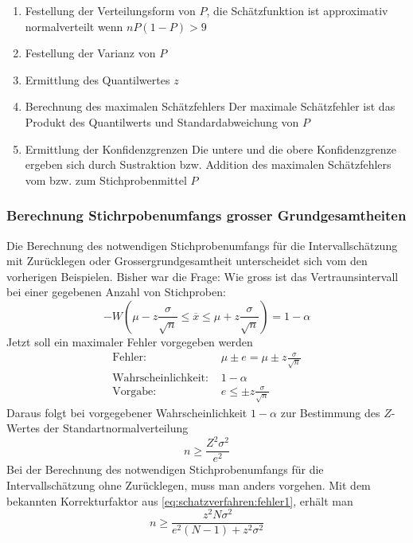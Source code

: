 \begin{enumerate}
\item Festellung der Verteilungsform von $P$, die Schätzfunktion ist approximativ normalverteilt wenn $n P(1-P)>9$
\item Festellung der Varianz von $P$
\item Ermittlung des Quantilwertes $z$
\item Berechnung des maximalen Schätzfehlers
\subitem Der maximale Schätzfehler ist das Produkt des Quantilwerts und Standardabweichung von $P$
\item Ermittlung der Konfidenzgrenzen
\subitem Die untere und die obere Konfidenzgrenze ergeben sich durch Sustraktion bzw. Addition des maximalen Schätzfehlers vom bzw. zum Stichprobenmittel $P$
\end{enumerate}
\subsubsection{Berechnung Stichrpobenumfangs grosser Grundgesamtheiten}
Die Berechnung des notwendigen Stichprobenumfangs für die Intervallschätzung mit Zurücklegen oder Grossergrundgesamtheit unterscheidet sich vom den vorherigen Beispielen. Bisher war die Frage: Wie gross ist das Vertraunsintervall bei einer gegebenen Anzahl von Stichproben:
\begin{equation}\label{eq:stichprobenumfang:1}
-W\left(\mu - z \frac{\sigma}{\sqrt{n}}\leq \overline{x}\leq \mu + z \frac{\sigma}{\sqrt{n}}\right)=1-\alpha
\end{equation}
Jetzt soll ein maximaler Fehler vorgegeben werden
\begin{align}
\text{Fehler: }&\mu\pm e = \mu \pm z\frac{\sigma}{\sqrt{n}}\label{eq:schatzverfahren:fehler1} \\ 
\text{Wahrscheinlichkeit: }&1-\alpha\\
\text{Vorgabe: }&e\leq\pm z\frac{\sigma}{\sqrt{n}}
\end{align}
Daraus folgt bei vorgegebener Wahrscheinlichkeit $1-\alpha$ zur Bestimmung des $Z$-Wertes der Standartnormalverteilung
\begin{equation}
n \geq \frac{Z^2\sigma^2}{e^2}
\end{equation}
Bei der Berechnung des notwendigen Stichprobenumfangs für die Intervallschätzung ohne Zurücklegen, muss man anders vorgehen. Mit dem bekannten Korrekturfaktor aus \autoref{eq:schatzverfahren:fehler1}, erhält man
\begin{equation}\label{eq:schätzverfahren:2}
n \geq \frac{z^2 N \sigma^2}{e^2(N-1)+z^2\sigma^2}
\end{equation}
